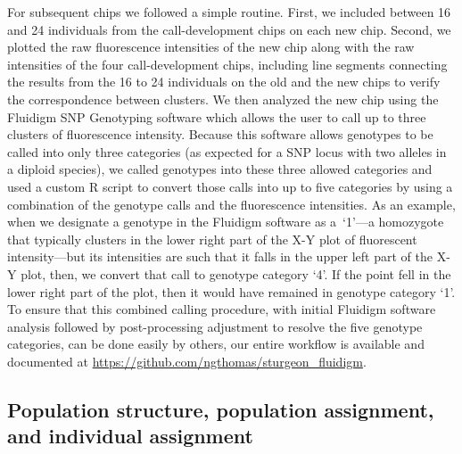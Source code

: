 For subsequent chips we followed a simple routine. First, we included between 16
and 24 individuals from the call-development chips on each new chip. Second, we
plotted the raw fluorescence intensities of the new chip along with the raw
intensities of the four call-development chips, including line segments
connecting the results from the 16 to 24 individuals on the old and the new
chips to verify the correspondence between clusters. 
We then analyzed the new chip using the Fluidigm SNP Genotyping
software which allows the user to call up to three clusters of 
fluorescence intensity. Because
this software allows genotypes to be called into only three categories (as
expected for a SNP locus with two alleles in a diploid species), we called genotypes
into these three allowed categories and used a custom R script \citep{RCore2015} 
to convert those calls into up to five categories by using
a combination of the genotype calls and the fluorescence intensities. As
an example, when we designate a genotype in the Fluidigm software as a~`1'---a homozygote that typically clusters
in the lower right part of the X-Y plot of fluorescent intensity---but its
intensities are such that it falls in the upper left part of the X-Y plot, then,
we convert that call to genotype category `4'. If the point fell in
the lower right part of the plot, then it would have remained in genotype
category `1'.  To ensure that this combined calling procedure, with initial
Fluidigm software analysis followed by post-processing adjustment
to resolve the five genotype categories, can be done easily by others, our 
entire workflow is available and documented at \url{https://github.com/ngthomas/sturgeon_fluidigm}.



\subsection{Population structure,  population assignment, and individual assignment}

